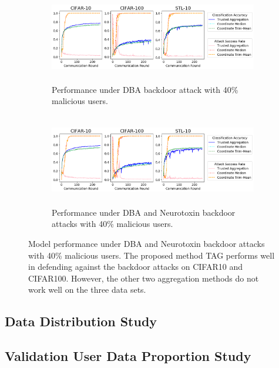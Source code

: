 \documentclass{article} %
\begin{document}
\begin{figure}[htp]
\centering
  \begin{subfigure}{\textwidth}
  \centering
    \includegraphics[height=4cm, width=\textwidth]{make_article/make_visuals/visuals/accuracy--n_malicious4--dba1--beta0.2--d_scale.png}
    \caption{\footnotesize Performance under DBA backdoor attack with 40\% malicious users.}
  \end{subfigure}%

  \begin{subfigure}{\textwidth}
  \centering
    \includegraphics[height=4cm, width=\textwidth]{make_article/make_visuals/visuals/accuracy--n_malicious4--dba1--beta0.2--d_scale--neuro_p0.1.png}
    \caption{\footnotesize Performance under DBA and Neurotoxin backdoor attacks with 40\% malicious users.}
  \end{subfigure}%
\caption{\footnotesize Model performance under DBA and Neurotoxin backdoor attacks with 40\% malicious users. The proposed method TAG performs well in defending against the backdoor attacks on CIFAR10 and CIFAR100. However, the other two aggregation methods do not work well on the three data sets.} 
\label{fig: accuracy--n_malicious4}
\end{figure}


%
\subsection{Data Distribution Study}


%
\subsection{Validation User Data Proportion Study}
\end{document}
